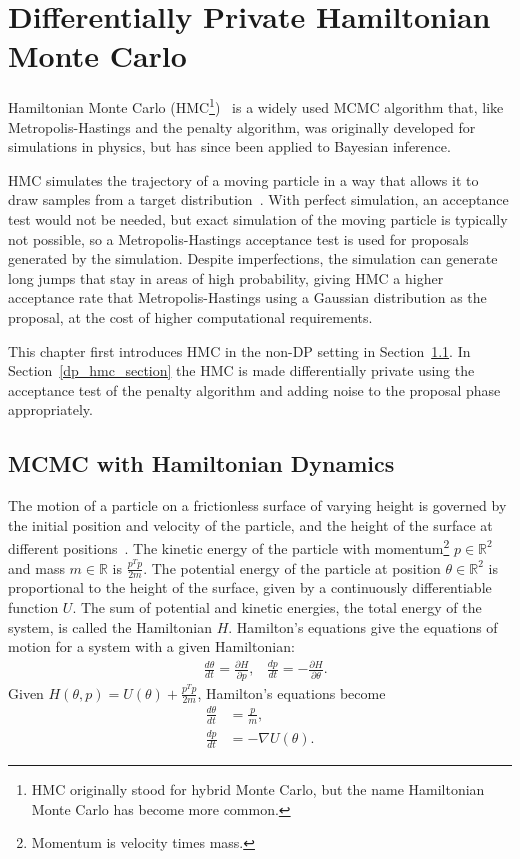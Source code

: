 \documentclass[english,twoside,openright]{HYgraduMLDS}
\newcommand{\R}{\mathbb{R}}
\begin{document}
\chapter{Differentially Private Hamiltonian Monte Carlo}\label{hmc_chapter}

Hamiltonian Monte Carlo (HMC\footnote{
    HMC originally stood for hybrid Monte Carlo, 
    but the name Hamiltonian Monte Carlo has become more common.
})~\cite{DKP87, neal2012mcmc} is a widely used MCMC algorithm that, like
Metropolis-Hastings and the penalty algorithm, was originally developed 
for simulations in physics, but has since been applied to
Bayesian inference. 

HMC simulates the trajectory of a moving particle in a way 
that allows it to draw samples from a target distribution~\cite{neal2012mcmc}. 
With perfect simulation,
an acceptance test would not be needed, but exact simulation of the moving particle 
is typically not possible, so a Metropolis-Hastings acceptance test is used
for proposals generated by the simulation. Despite imperfections, the simulation can generate long jumps
that stay in areas of high probability, giving HMC a higher acceptance rate 
that Metropolis-Hastings using a Gaussian distribution as the proposal, at the 
cost of higher computational requirements.

This chapter first introduces HMC in the non-DP setting in Section~\ref{hmc_basics_section}.
In Section~\ref{dp_hmc_section} the HMC is made differentially private using the 
acceptance test of the penalty algorithm and adding noise to the proposal phase 
appropriately.

\section{MCMC with Hamiltonian Dynamics}\label{hmc_basics_section}

The motion of a particle on a frictionless surface of varying height is governed 
by the initial position and velocity of the particle, and the height of the 
surface at different positions~\cite{neal2012mcmc}. 
The kinetic energy of the particle with 
momentum\footnote{Momentum is velocity times mass.}
\(p \in \R^{2}\) and mass \(m \in \R\) is \(\frac{p^{T}p}{2m}\). The potential energy of the particle
at position \(\theta \in \R^{2}\) is proportional to the height of the surface, given by
a continuously differentiable function \(U\).
The sum of potential and kinetic energies, the total 
energy of the system, is called the Hamiltonian \(H\). Hamilton's equations 
give the equations of motion for a system with a given Hamiltonian:
\begin{align*}
    &\frac{d\theta}{dt} = \frac{\partial H}{\partial p},
    &\frac{dp}{dt} = -\frac{\partial H}{\partial \theta}.
\end{align*}
Given \(H(\theta, p) = U(\theta) + \frac{p^{T}p}{2m}\), Hamilton's equations become
\begin{align*}
    \frac{d\theta}{dt} &= \frac{p}{m}, \\
    \frac{dp}{dt} &= -\nabla U(\theta).
\end{align*}
\end{document}
